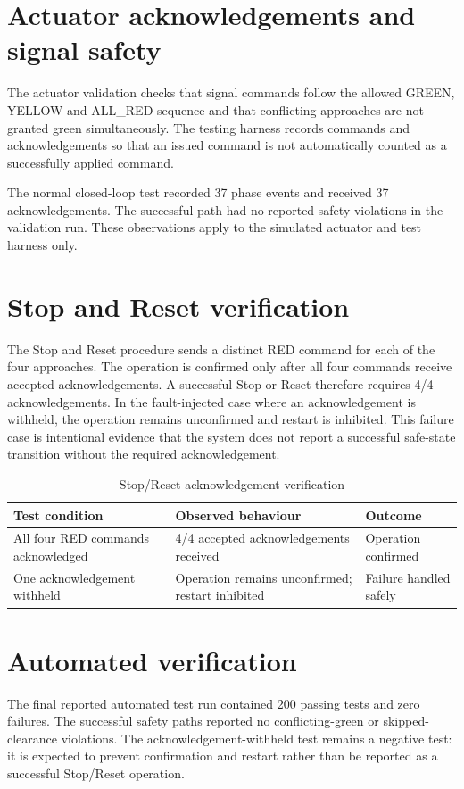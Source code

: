 \documentclass[12pt,a4paper,oneside]{report}
\begin{document}
\section{Actuator acknowledgements and signal safety}
The actuator validation checks that signal commands follow the allowed GREEN, YELLOW and ALL\_RED sequence and that conflicting approaches are not granted green simultaneously. The testing harness records commands and acknowledgements so that an issued command is not automatically counted as a successfully applied command.

The normal closed-loop test recorded 37 phase events and received 37 acknowledgements. The successful path had no reported safety violations in the validation run. These observations apply to the simulated actuator and test harness only.

\section{Stop and Reset verification}
The Stop and Reset procedure sends a distinct RED command for each of the four approaches. The operation is confirmed only after all four commands receive accepted acknowledgements. A successful Stop or Reset therefore requires 4/4 acknowledgements. In the fault-injected case where an acknowledgement is withheld, the operation remains unconfirmed and restart is inhibited. This failure case is intentional evidence that the system does not report a successful safe-state transition without the required acknowledgement.

\begin{table}[htbp]\centering\small
\caption{Stop/Reset acknowledgement verification}\label{tab:stop-reset}
\begin{tabular}{|p{}|p{}|p{}|}\hline
\textbf{Test condition} & \textbf{Observed behaviour} & \textbf{Outcome} \\\hline
All four RED commands acknowledged & 4/4 accepted acknowledgements received & Operation confirmed \\\hline
One acknowledgement withheld & Operation remains unconfirmed; restart inhibited & Failure handled safely \\\hline
\end{tabular}\end{table}

\section{Automated verification}
The final reported automated test run contained 200 passing tests and zero failures. The successful safety paths reported no conflicting-green or skipped-clearance violations. The acknowledgement-withheld test remains a negative test: it is expected to prevent confirmation and restart rather than be reported as a successful Stop/Reset operation.
\end{document}
